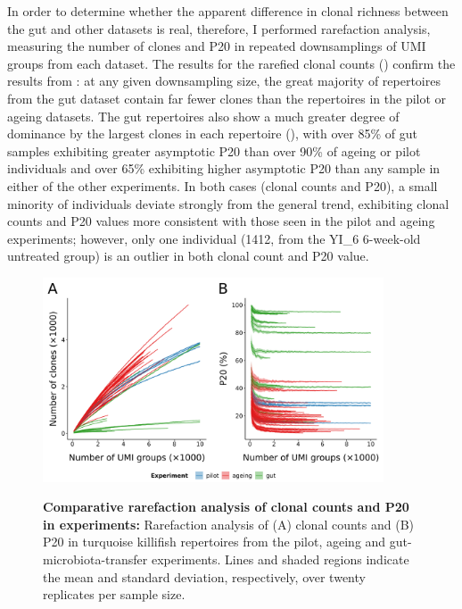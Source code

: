 In order to determine whether the apparent difference in clonal richness between the gut and other datasets is real, therefore, I performed rarefaction analysis, measuring the number of clones and P20 in repeated downsamplings of UMI groups from each dataset. The results for the rarefied clonal counts () confirm the results from : at any given downsampling size, the great majority of repertoires from the gut dataset contain far fewer clones than the repertoires in the pilot or ageing datasets. The gut repertoires also show a much greater degree of dominance by the largest clones in each repertoire (), with over 85\% of gut samples exhibiting greater asymptotic P20 than over 90\% of ageing or pilot individuals and over 65\% exhibiting higher asymptotic P20 than any sample in either of the other experiments. In both cases (clonal counts and P20), a small minority of individuals deviate strongly from the general trend, exhibiting clonal counts and P20 values more consistent with those seen in the pilot and ageing experiments; however, only one individual (1412, from the YI\_6 6-week-old untreated group) is an outlier in both clonal count and P20 value.

\begin{figure}
\centering
\includegraphics[width = 0.9\textwidth]{_Figures/png/igseq-rarefied-clones}
\begin{subfigure}{0em}
\label{fig:igseq-rarefied-clone-counts}
\end{subfigure}
\begin{subfigure}{0em}
\label{fig:igseq-rarefied-clone-p20}
\end{subfigure}
\caption[Comparative rarefaction analysis of clonal counts and P20 in \igseq experiments]{\textbf{Comparative rarefaction analysis of clonal counts and P20 in \igseq experiments:} Rarefaction analysis of (A) clonal counts and (B) P20 in turquoise killifish repertoires from the \igseq pilot, ageing and gut-microbiota-transfer experiments. Lines and shaded regions indicate the mean and standard deviation, respectively, over twenty replicates per sample size.}
\label{fig:igseq-rarefied-clones}
\end{figure}


